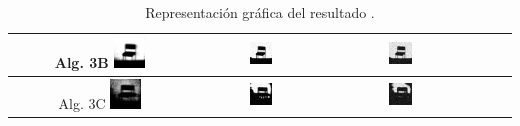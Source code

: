 \begin{table}
\centering
\begin{tabular}{cccccc}\hline
Alg. 3B\quad
\includegraphics[width=0.18\textwidth]{img/res/e3a/alg3btipo-chairga.jpg} &
\includegraphics[width=0.18\textwidth]{img/res/e3a/alg3btipo-chairsp005.jpg} &
\includegraphics[width=0.18\textwidth]{img/res/e3a/alg3btipo-chairsp020.jpg}\\\hline
Alg. 3C\quad     
\includegraphics[width=0.18\textwidth]{img/res/e3a/alg3ctipo-chairga.jpg} &
\includegraphics[width=0.18\textwidth]{img/res/e3a/alg3ctipo-chairsp005.jpg} &
\includegraphics[width=0.18\textwidth]{img/res/e3a/alg3ctipo-chairsp020.jpg}\\\hline
\end{tabular}
\caption{Representación gráfica del resultado .\label{tab:resultexp3imagenesruido}}
\end{table}


